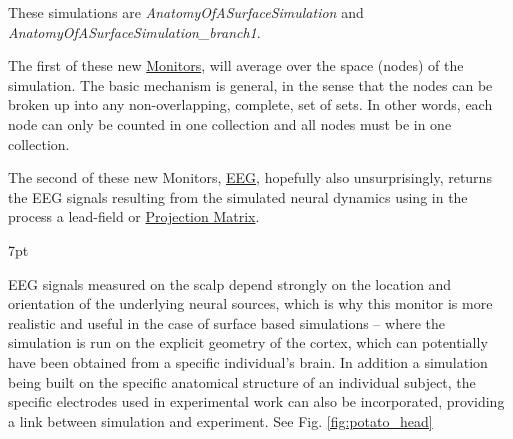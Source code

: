 \documentclass{tufte-handout}
\newenvironment{blah}{%
  \def\FrameCommand{%
    \hspace{1pt}%
    {\color{DarkOrange}\vrule width 2pt}%
    {\color{PeachPuff}\vrule width 4pt}%
    \colorbox{PeachPuff}%
  }%
  \MakeFramed{\advance\hsize-\width\FrameRestore}%
  \noindent\hspace{-4.55pt}%
  \begin{adjustwidth}{}{7pt}%
  \vspace{2pt}\vspace{2pt}%
}
{%
  \vspace{2pt}\end{adjustwidth}\endMakeFramed%
}
\begin{document}
These simulations are \textit{AnatomyOfASurfaceSimulation} and \textit{AnatomyOfASurfaceSimulation\_branch1}. 


The first of these new \underline{Monitors},  will average over the
space (nodes) of the simulation.  The basic
mechanism is general, in the sense that the nodes can be broken up into any
non-overlapping, complete, set of sets. In other words, each node can only
be counted in one collection and all nodes must be in one collection.  





The second of these new Monitors, \underline{EEG}, hopefully also
unsurprisingly, returns the EEG signals resulting from the simulated neural
dynamics using in the process a lead-field or \underline{Projection Matrix}.  



\begin{blah}
EEG signals measured on the scalp depend strongly on the location
and orientation of the underlying neural sources, which is why this monitor is
more realistic and useful in the case of surface based simulations -- where
the simulation is run on the explicit geometry of the cortex, which can
potentially have been obtained from a specific individual's brain. 
In addition a simulation being built on the specific anatomical structure of an individual
subject, the specific electrodes used in experimental work can also be
incorporated, providing a link between simulation and
experiment. See Fig. \ref{fig:potato_head}
\end{blah}
\end{document}

